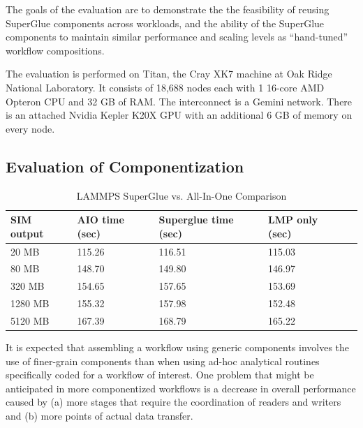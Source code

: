 The goals of the evaluation are to demonstrate the  the feasibility of reusing
  SuperGlue components across workloads, and the ability of the
  SuperGlue components to maintain similar performance and scaling
levels as ``hand-tuned'' workflow compositions. 
\fi

The evaluation is performed on Titan, the Cray XK7 machine at Oak Ridge
National Laboratory. It consists of 18,688 nodes each with 1 16-core AMD
Opteron CPU and 32 GB of RAM. The interconnect is a Gemini network. There is an
attached Nvidia Kepler K20X GPU with an additional 6 GB of memory on every
node.

\subsection{Evaluation of Componentization}

\begin{table}[tbp]
  \centering
  \caption{LAMMPS SuperGlue vs. All-In-One Comparison}
  \label{tab:aio}
  \vspace{-0.07in}
  \begin{tabular}{|l|l|l|l|l|}
    \hline
    SIM output & AIO time (sec) & Superglue time (sec) & LMP only (sec) \\
    \hline
    20 MB & 115.26 & 116.51 & 115.03\\
    \hline
    80 MB & 148.70 & 149.80 & 146.97\\
    \hline
    320 MB & 154.65 & 157.65 & 153.69\\
    \hline
    1280 MB & 155.32 & 157.98 & 152.48\\
    \hline
    5120 MB & 167.39 & 168.79 & 165.22\\
    \hline
  \end{tabular}
  \vspace{-0.15in}
\end{table}

It is expected that assembling a workflow
using generic components involves the use
of finer-grain components
than when using ad-hoc analytical routines
specifically coded
for a workflow of interest.
One problem that might be anticipated
in more componentized workflows
is a decrease in overall performance caused by
(a) more stages that require the coordination
of readers and writers
and (b) more points of actual data transfer.


